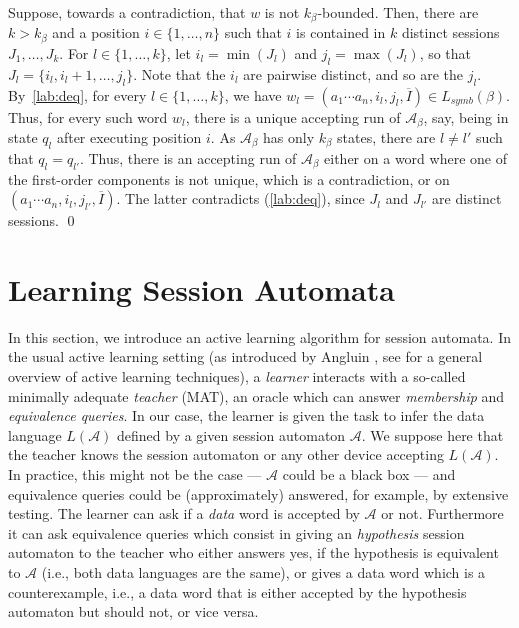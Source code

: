 \documentclass{LMCS}
\newcommand{\set}[1]{\{1,\ldots,#1\}}
\def\A{\mathcal A}
\newcommand{\symbL}{L_\mathit{symb}}
\newcommand{\newk}{k}
\newcommand{\dataf}{\beta}
\newcommand{\kphi}{k_\dataf}
\newcommand{\tupleI}{\overline{I}}
\begin{document}
Suppose, towards a contradiction, that $w$ is not
$\kphi$-bounded. Then, there are $k > \kphi$ and a position $i \in
\set{n}$ such that $i$ is contained in $k$ distinct sessions
$J_1,\ldots,J_{\newk}$. For $l \in \{1,\ldots,\newk\}$, let $i_l =
\min(J_l)$ and $j_l = \max(J_l)$, so that $J_l =
\{i_l,i_l+1,\ldots,j_l\}$. Note that the $i_l$ are pairwise distinct,
and so are the $j_l$. By~\eqref{lab:deq}, for every $l \in
\{1,\ldots,\newk\}$, we have $w_l = (a_1 \cdots a_n,i_l,j_l,\tupleI)
\in \symbL(\dataf)$. Thus, for every such word $w_l$, there is a
unique accepting run of $\A_\dataf$, say, being in state $q_l$ after
executing position $i$. As $\A_\dataf$ has only $\kphi$ states, there
are $l \neq l'$ such that $q_l = q_{l'}$. Thus, there is an accepting
run of $\A_\dataf$ either on a word where one of the first-order
components is not unique, which is a contradiction, or on $(a_1 \cdots
a_n,i_l,j_{l'},\tupleI)$. The latter contradicts (\ref{lab:deq}),
since $J_l$ and $J_{l'}$ are distinct sessions. \qed



\section{Learning Session Automata}
\label{sec:learning}

In this section, we introduce an active learning algorithm for session
automata. In the usual active learning setting (as introduced by
Angluin \cite{Angluin:regset}, see \cite{Hig10} for a general overview
of active learning techniques), a \emph{learner} interacts with a
so-called minimally adequate \emph{teacher} (MAT), an oracle which can
answer \emph{membership} and \emph{equivalence queries}.  In our case,
the learner is given the task to infer the data language $ L(\A)$
defined by a given session automaton $\A$.  We suppose here that the
teacher knows the session automaton or any other device accepting $
L(\A)$. In practice, this might not be the case --- $\A$ could be a
black box --- and equivalence queries could be (approximately)
answered, for example, by extensive testing.  The learner can ask if a
\emph{data} word is accepted by $\A$ or not.  Furthermore it can ask
equivalence queries which consist in giving an \emph{hypothesis}
session automaton to the teacher who either answers yes, if the
hypothesis is equivalent to $\A$ (i.e., both data languages are the
same), or gives a data word which is a counterexample, i.e., a data
word that is either accepted by the hypothesis automaton but should
not, or vice versa.
\end{document}
